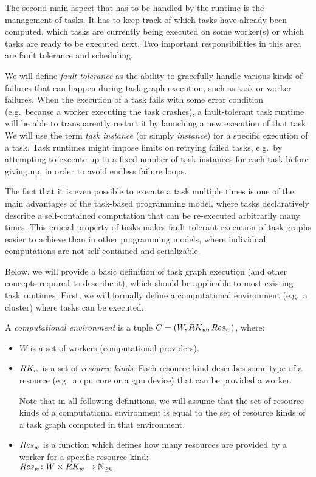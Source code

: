 The second main aspect that has to be handled by the runtime is the management of tasks. It has to
keep track of which tasks have already been computed, which tasks are currently being executed on
some worker(s) or which tasks are ready to be executed next. Two important responsibilities in this
area are fault tolerance and scheduling.

We will define \emph{fault tolerance} as the ability to gracefully handle various kinds of
failures that can happen during task graph execution, such as task or worker failures. When the
execution of a task fails with some error condition (e.g.\ because a worker executing the task
crashes), a fault-tolerant task runtime will be able to transparently restart it by launching a new
execution of that task. We will use the term \emph{task instance} (or simply \emph{instance}) for a specific execution of a
task. Task runtimes might impose limits on retrying failed tasks, e.g.\ by attempting to execute up
to a fixed number of task instances for each task before giving up, in order to avoid endless
failure loops.

The fact that it is even possible to execute a task multiple times is one of the main advantages of
the task-based programming model, where tasks declaratively describe a self-contained computation
that can be re-executed arbitrarily many times. This crucial property of tasks makes fault-tolerant
execution of task graphs easier to achieve than in other programming models, where individual
computations are not self-contained and serializable.

Below, we will provide a basic definition of task graph execution (and other concepts required to
describe it), which should be applicable to most existing task runtimes. First, we will formally
define a computational environment (e.g.\ a cluster) where tasks can be executed.

\vspace{2mm} A \emph{computational environment} is a tuple
$C = (W, RK_w, Res_w)$, where:
\begin{itemize}[itemsep=0pt]
	\item $W$ is a set of workers (computational providers).
	\item $RK_w$ is a set of \emph{resource kinds}. Each resource kind
	      describes some type of a resource (e.g.\ a \gls{cpu} core or a \gls{gpu} device) that
		  can be provided a worker.

	      Note that in all following definitions, we will assume that the set of resource kinds
		  of a computational environment is equal to the set of resource kinds of a task graph
		  computed in that environment.
	\item $Res_w$ is a function which defines how many resources are
	      provided by a worker for a specific resource kind: \\ $Res_w\colon W \times RK_w \rightarrow
		      \mathbb{N}_{\geq{}0}$
\end{itemize}

